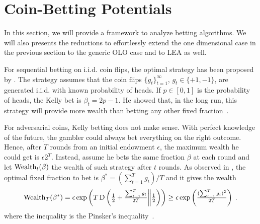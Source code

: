 \section{Coin-Betting Potentials}
\label{section:coin-betting-potentials}

In this section, we will provide a framework to analyze betting algorithms.
We will also presents the reductions to effortlessly extend the one dimensional case in the previous section to the
generic \ac{OLO} case and to \ac{LEA} as well.

For sequential betting on i.i.d. coin flips, the optimal strategy has been proposed by \citet{Kelly-1956}.
The strategy assumes that the coin flips $\{g_t\}_{t=1}^\infty$, $g_t
\in \{+1,-1\}$, are generated i.i.d. with known probability of heads. If $p \in
[0,1]$ is the probability of heads, the Kelly bet is $\beta_t = 2p - 1$. He
showed that, in the long run, this strategy will provide more wealth than
betting any other fixed fraction~\cite{Kelly-1956}.

For adversarial coins, Kelly betting does not make sense. With perfect knowledge
of the future, the gambler could always bet everything on the right outcome.
Hence, after $T$ rounds from an initial endowment $\epsilon$, the maximum
wealth he could get is $\epsilon 2^T$.  Instead, assume he bets the same
fraction $\beta$ at each round and let $\operatorname{Wealth}_t(\beta)$ the wealth of such strategy
after $t$ rounds. As observed in
\cite{McMahan-Abernethy-2013}, the optimal fixed fraction to bet is
$\beta^*=(\sum_{t=1}^T g_t)/T$ and it gives the wealth
\begin{equation}
\label{eq:opt_wealth}
\operatorname{Wealth}_T(\beta^*)
= \epsilon \exp\left(T \operatorname{D}\left({\tfrac{1}{2}+\tfrac{\sum_{t=1}^T g_t}{2T}}\middle\|{\tfrac{1}{2}}\right)\right)
\geq \epsilon \exp\left(\tfrac{(\sum_{t=1}^T g_t)^2}{2 T}\right) \; .
\end{equation}
where the inequality is the Pinsker's inequality~\citep[Lemma 11.6.1]{Cover-Thomas-2006}.

